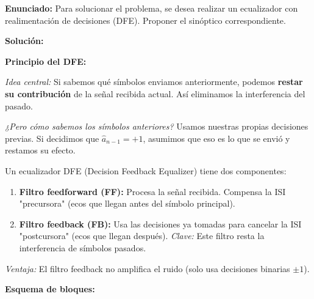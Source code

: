 \documentclass[11pt,a4paper]{article}
\begin{document}
\textbf{Enunciado:} Para solucionar el problema, se desea realizar un ecualizador con realimentación de decisiones (DFE). Proponer el sinóptico correspondiente.

\vspace{0.3cm}
\textbf{Solución:}

\textbf{Principio del DFE:}

\textit{Idea central:} Si sabemos qué símbolos enviamos anteriormente, podemos \textbf{restar su contribución} de la señal recibida actual. Así eliminamos la interferencia del pasado.

\textit{¿Pero cómo sabemos los símbolos anteriores?} Usamos nuestras propias decisiones previas. Si decidimos que $\hat{a}_{n-1} = +1$, asumimos que eso es lo que se envió y restamos su efecto.

Un ecualizador DFE (Decision Feedback Equalizer) tiene dos componentes:

\begin{enumerate}
    \item \textbf{Filtro feedforward (FF):} Procesa la señal recibida. Compensa la ISI "precursora" (ecos que llegan antes del símbolo principal).
    
    \item \textbf{Filtro feedback (FB):} Usa las decisiones ya tomadas para cancelar la ISI "postcursora" (ecos que llegan después). \textit{Clave:} Este filtro resta la interferencia de símbolos pasados.
\end{enumerate}

\textit{Ventaja:} El filtro feedback no amplifica el ruido (solo usa decisiones binarias $\pm 1$).

\textbf{Esquema de bloques:}
\end{document}
